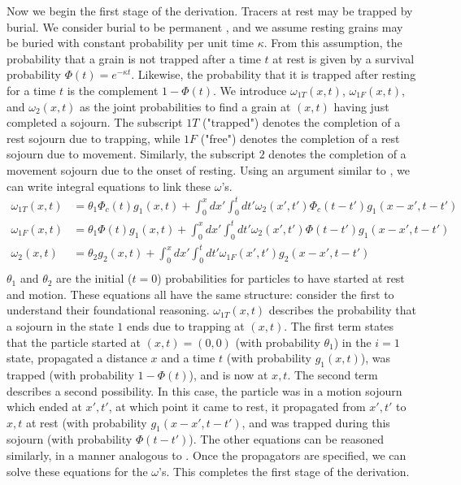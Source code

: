 \documentclass[]{agujournal2018}
\newcommand\om{\omega}
\begin{document}
Now we begin the first stage of the derivation.
Tracers at rest may be trapped by burial.
We consider burial to be permanent \citep[e.g.][]{Wu2019}, and we assume resting grains may be buried with constant probability per unit time $\kappa$.
From this assumption, the probability that a grain is not trapped after a time $t$ at rest is given by a survival probability $\Phi(t) = e^{-\kappa t}$. Likewise, the probability that it is trapped after resting for a time $t$ is the complement $1-\Phi(t)$.
We introduce $\omega_{1T}(x,t)$, $\omega_{1F}(x,t)$, and $\omega_2(x,t)$ as the joint probabilities to find a grain at $(x,t)$ having just completed a sojourn.
The subscript ${1T}$ ("trapped") denotes the completion of a rest sojourn due to trapping, while $1F$ ("free") denotes the completion of a rest sojourn due to movement.
Similarly, the subscript $2$ denotes the completion of a movement sojourn due to the onset of resting.
Using an argument similar to \citet{Weiss1994}, we can write integral equations to link these $\omega$'s. 
\begin{align}
\om_{1T}(x,t) &= \theta_1\Phi_c(t)g_1(x,t) + \int_0^x dx' \int_0^t dt' \om_2(x',t')\Phi_c(t-t')g_1(x-x',t-t')\label{eq:x}\\
\om_{1F}(x,t) &= \theta_1\Phi(t)g_1(x,t) + \int_0^x dx' \int_0^t dt' \om_2(x',t') \Phi(t-t') g_1(x-x',t-t')\\
\om_2(x,t) &= \theta_2 g_2(x,t) + \int_0^x dx' \int_0^t dt' \om_{1F}(x',t')g_2(x-x',t-t') \\
\end{align}
$\theta_1$ and $\theta_2$ are the initial ($t=0$) probabilities for particles to have started at rest and motion.
These equations all have the same structure: consider the first to understand their foundational reasoning.
$\omega_{1T}(x,t)$ describes the probability that a sojourn in the state $1$ ends due to trapping at $(x,t)$. The first term states that the particle started at $(x,t)=(0,0)$ (with probability $\theta_1$) in the $i=1$ state, propagated a distance $x$ and a time $t$ (with probability $g_1(x,t)$), was trapped (with probability $1-\Phi(t)$), and is now at $x,t$. 
The second term describes a second possibility.
In this case, the particle was in a motion sojourn which ended at $x',t'$, at which point it came to rest, it propagated from $x',t'$ to $x,t$ at rest (with probability $g_1(x-x',t-t')$, and was trapped during this sojourn (with probability $\Phi(t-t')$).
The other equations can be reasoned similarly, in a manner analogous to \citet{Weiss1994}.
Once the propagators are specified, we can solve these equations for the $\omega$'s. This completes the first stage of the derivation.
\end{document}
